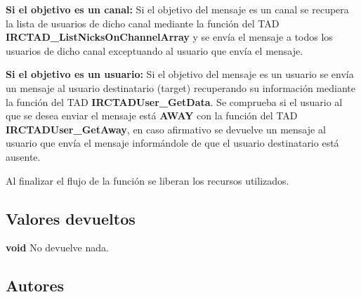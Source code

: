 \begin{DoxyItemize}
\item {\bfseries Si el objetivo es un canal\+:} Si el objetivo del mensaje es un canal se recupera la lista de usuarios de dicho canal mediante la función del T\+A\+D {\bfseries I\+R\+C\+T\+A\+D\+\_\+\+List\+Nicks\+On\+Channel\+Array} y se envía el mensaje a todos los usuarios de dicho canal exceptuando al usuario que envía el mensaje.  
\item {\bfseries Si el objetivo es un usuario\+:} Si el objetivo del mensaje es un usuario se envía un mensaje al usuario destinatario (target) recuperando su información mediante la función del T\+A\+D {\bfseries I\+R\+C\+T\+A\+D\+User\+\_\+\+Get\+Data}. Se comprueba si el usuario al que se desea enviar el mensaje está {\bfseries A\+W\+A\+Y} con la función del T\+A\+D {\bfseries I\+R\+C\+T\+A\+D\+User\+\_\+\+Get\+Away}, en caso afirmativo se devuelve un mensaje al usuario que envía el mensaje informándole de que el usuario destinatario está ausente.  
\end{DoxyItemize}

Al finalizar el flujo de la función se liberan los recursos utilizados.\hypertarget{server_command_privmsg_return_privmsg}{}\subsection{Valores devueltos}\label{server_command_privmsg_return_privmsg}

\begin{DoxyItemize}
\item {\bfseries void} No devuelve nada. 
\end{DoxyItemize}\hypertarget{server_command_privmsg_authors_privmsg}{}\subsection{Autores}\label{server_command_privmsg_authors_privmsg}

